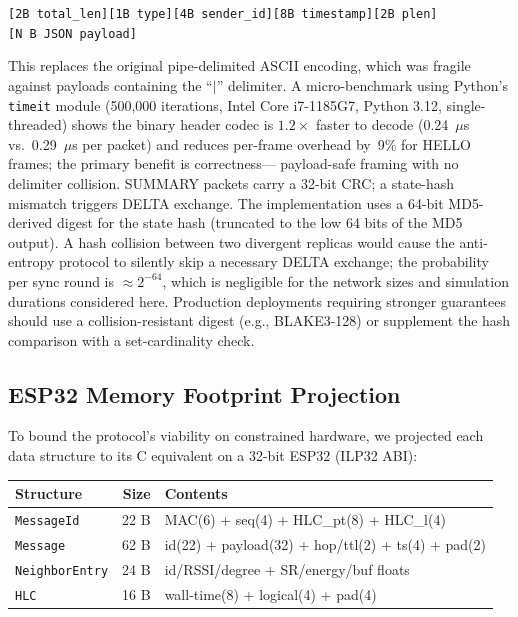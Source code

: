 \documentclass[conference]{IEEEtran}
\begin{document}
\begin{center}
\texttt{[2B~total\_len][1B~type][4B~sender\_id][8B~timestamp][2B~plen][N~B~JSON~payload]}
\end{center}

This replaces the original pipe-delimited ASCII encoding, which was fragile
against payloads containing the ``$|$'' delimiter.  A micro-benchmark using
Python's \texttt{timeit} module (500{,}000 iterations, Intel Core i7-1185G7,
Python 3.12, single-threaded) shows the binary header codec is $1.2\times$ faster to
decode (0.24~$\mu$s vs.\ 0.29~$\mu$s per packet) and reduces per-frame
overhead by~9\% for HELLO frames; the primary benefit is correctness---
payload-safe framing with no delimiter collision.  SUMMARY packets carry a
32-bit CRC; a state-hash mismatch triggers DELTA exchange.
The implementation uses a 64-bit MD5-derived digest for the state hash
(truncated to the low 64 bits of the MD5 output).  A hash collision between
two divergent replicas would cause the anti-entropy protocol to silently skip
a necessary DELTA exchange; the probability per sync round is $\approx 2^{-64}$,
which is negligible for the network sizes and simulation durations considered
here.  Production deployments requiring stronger guarantees should use a
collision-resistant digest (e.g., BLAKE3-128) or supplement the hash comparison
with a set-cardinality check.

\subsection{ESP32 Memory Footprint Projection}
\label{ssec:memory}

To bound the protocol's viability on constrained hardware, we projected each
data structure to its C equivalent on a 32-bit ESP32 (ILP32 ABI):

\begin{center}
\setlength{\tabcolsep}{4pt}
\begin{tabular}{lrl}
  \toprule
  \textbf{Structure} & \textbf{Size} & \textbf{Contents} \\
  \midrule
  \texttt{MessageId} & 22 B & MAC(6) + seq(4) + HLC\_pt(8) + HLC\_l(4) \\
  \texttt{Message}   & 62 B & id(22) + payload(32) + hop/ttl(2) + ts(4) + pad(2) \\
  \texttt{NeighborEntry} & 24 B & id/RSSI/degree + SR/energy/buf floats \\
  \texttt{HLC}       & 16 B & wall-time(8) + logical(4) + pad(4) \\
  \bottomrule
\end{tabular}
\end{center}
\end{document}
